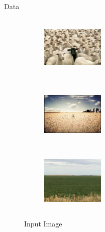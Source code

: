 \documentclass{beamer}
\theoremstyle{plain}
\theoremstyle{definition}
\theoremstyle{plain}
\theoremstyle{plain}
\begin{document}
\begin{frame}{Data}
\begin{figure}[t!]
\medskip
\begin{subfigure}{0.32\textwidth}
\includegraphics[height=3cm,width=3cm]{./Figures/sheep.jpg}
\caption{} \label{fig:d}
\end{subfigure}\hspace*{\fill}
\begin{subfigure}{0.32\textwidth}
\includegraphics[height=3cm,width=3cm]{./Figures/girlf.jpg}
\caption{} \label{fig:e}
\end{subfigure}
\begin{subfigure}{0.32\textwidth}
\includegraphics[height=3cm,width=3cm]{./Figures/duck.jpg}
\caption{} \label{fig:f}
\end{subfigure}

\caption{Input Image} \label{fig:input}
\end{figure}
\end{frame}
\end{document}
